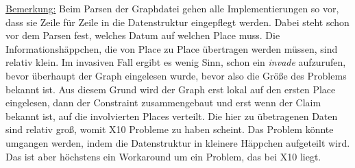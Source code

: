 \underline{Bemerkung:}
Beim Parsen der Graphdatei gehen alle Implementierungen so vor, dass sie Zeile für Zeile in die Datenstruktur eingepflegt werden. Dabei steht schon vor dem Parsen fest, welches Datum auf welchen Place muss. Die Informationshäppchen, die von Place zu Place übertragen werden müssen, sind relativ klein. Im invasiven Fall ergibt es wenig Sinn, schon ein \textit{invade} aufzurufen, bevor überhaupt der Graph eingelesen wurde, bevor also die Größe des Problems bekannt ist. Aus diesem Grund wird der Graph erst lokal auf den ersten Place eingelesen, dann der Constraint zusammengebaut und erst wenn der Claim bekannt ist, auf die involvierten Places verteilt. Die hier zu übetragenen Daten sind relativ groß, womit X10 Probleme zu haben scheint. Das Problem könnte umgangen werden, indem die Datenstruktur in kleinere Häppchen aufgeteilt wird. Das ist aber höchstens ein Workaround um ein Problem, das bei X10 liegt.
